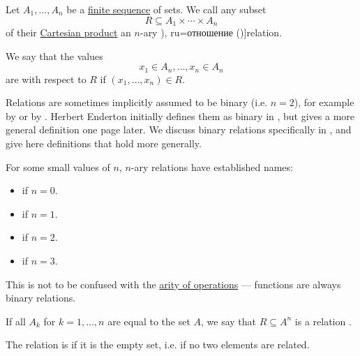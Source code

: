 \begin{definition}\label{def:relation}
  Let \( A_1, \ldots, A_n \) be a \hyperref[def:sequence]{finite sequence} of sets. We call any subset
  \begin{equation*}
    R \subseteq A_1 \times \cdots \times A_n
  \end{equation*}
  of their \hyperref[def:cartesian_product/product]{Cartesian product} an \( n \)-ary \term[bg=релация (\cite[5]{КоцевСидеров2016}), ru=отношение (\cite[sec. 9.3]{Тыртышников2007})]{relation}.

  We say that the values
  \begin{equation*}
    x_1 \in A_n, \ldots, x_n \in A_n
  \end{equation*}
  are  with respect to \( R \) if \( (x_1, \ldots, x_n) \in R \).

  Relations are sometimes implicitly assumed to be binary (i.e. \( n = 2 \)), for example by  or by . Herbert Enderton initially defines them as binary in , but gives a more general definition one page later. We discuss binary relations specifically in , and give here definitions that hold more generally.

  \begin{thmenum}[series=def:relation]
     For some small values of \( n \), \( n \)-ary relations have established names:
    \begin{itemize}
      \item {} if \( n = 0 \).
      \item {} if \( n = 1 \).
      \item {} if \( n = 2 \).
      \item {} if \( n = 3 \).
    \end{itemize}

    This is not to be confused with the \hyperref[def:operation_on_set]{arity of operations} --- functions are always binary relations.

     If all \( A_k \) for \( k = 1, \ldots, n \) are equal to the set \( A \), we say that \( R \subseteq A^n \) is a relation .

     The relation is  if it is the empty set, i.e. if no two elements are related.
  \end{thmenum}
\end{definition}

